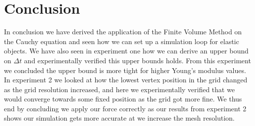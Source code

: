 \section{Conclusion}
In conclusion we have derived the application of the Finite Volume Method on the Cauchy equation and seen how we can set up a simulation loop for elastic objects. We have also seen in experiment one how we can derive an upper bound on $\Delta t$ and experimentally verified this upper bounds holds. From this experiment we concluded the upper bound is more tight for higher Young's modulus values. In experiment 2 we looked at how the lowest vertex position in the grid changed as the grid resolution increased, and here we experimentally verified that we would converge towards some fixed position as the grid got more fine. We thus end by concluding we apply our force correctly as our results from experiment 2 shows our simulation gets more accurate at we increase the mesh resolution.